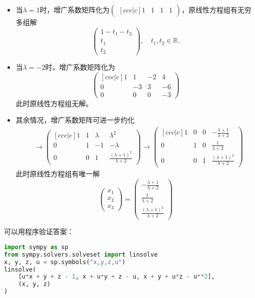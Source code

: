 \begin{itemize}
\item 当$\lambda = 1$时，增广系数矩阵化为$\begin{pmatrix}[ccc|c] 1 & 1 & 1 & 1 \end{pmatrix}$，原线性方程组有无穷多组解
$$\begin{pmatrix}
  1 - t_1 - t_2 \\ t_1 \\ t_2
\end{pmatrix}, \quad t_1, t_2 \in \mathbb{R}.$$
\item 当$\lambda = -2$时，增广系数矩阵化为
$$\begin{pmatrix}[ccc|c] 1 & 1 & -2 & 4 \\ 0 & -3 & 3 & -6 \\ 0 & 0 & 0 & -3 \end{pmatrix}$$
此时原线性方程组无解。
\item 其余情况，增广系数矩阵可进一步约化
\begin{align*}
& \to
\begin{pmatrix}[ccc|c]
  1 & 1 & \lambda & \lambda^2 \\
  0 & 1 & -1 & -\lambda \\
  0 & 0 & 1 & \frac{(\lambda+1)^2}{\lambda+2}
\end{pmatrix} \to
\begin{pmatrix}[ccc|c]
  1 & 0 & 0 & -\frac{\lambda+1}{\lambda+2} \\
  0 & 1 & 0 & \frac{1}{\lambda+2} \\
  0 & 0 & 1 & \frac{(\lambda+1)^2}{\lambda+2}
\end{pmatrix}
\end{align*}
此时原线性方程组有唯一解
$$
\begin{pmatrix} x_1 \\ x_2 \\ x_3 \end{pmatrix} = \begin{pmatrix} -\frac{\lambda+1}{\lambda+2} \\ \frac{1}{\lambda+2} \\ \frac{(\lambda+1)^2}{\lambda+2} \end{pmatrix}
$$
\end{itemize}

可以用程序验证答案：
\begin{center}
\begin{lstlisting}[language=Python]
import sympy as sp
from sympy.solvers.solveset import linsolve
x, y, z, u = sp.symbols("x,y,z,u")
linsolve(
    [u*x + y + z - 1, x + u*y + z - u, x + y + u*z - u**2],
    (x, y, z)
)
\end{lstlisting}
\end{center}

